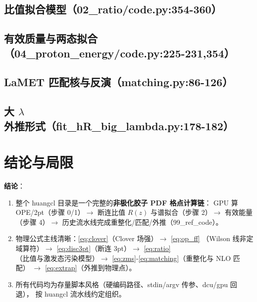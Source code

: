 \documentclass[UTF8,11pt]{ctexart}
\begin{document}
\subsection{比值拟合模型（02\_ratio/code.py:354-360）}


\subsection{有效质量与两态拟合（04\_proton\_energy/code.py:225-231,354）}


\subsection{LaMET 匹配核与反演（matching.py:86-126）}


\subsection{大 $\lambda$ 外推形式（fit\_hR\_big\_lambda.py:178-182）}


\section{结论与局限}
\label{sec:conclusion}

\textbf{结论}：
\begin{enumerate}
  \item 整个 huangcl 目录是一个完整的\textbf{非极化胶子 PDF 格点计算链}：
  GPU 算 OPE/2pt（步骤 0/1）$\to$ 断连比值 $R(z)$ 与谱拟合（步骤 2）$\to$
  有效能量（步骤 4）$\to$ 历史流水线完成重整化/匹配/外推（99\_ref\_code）。
  \item 物理公式主线清晰：\eqref{eq:clover}（Clover 场强）$\to$ \eqref{eq:op_ff}
  （Wilson 线非定域算符）$\to$ \eqref{eq:disc3pt}（断连 3pt）$\to$ \eqref{eq:ratio}
  （比值与激发态污染模型）$\to$ \eqref{eq:zms}-\eqref{eq:matching}（重整化与 NLO 匹配）
  $\to$ \eqref{eq:extrap}（外推到物理点）。
  \item 所有代码均为存量脚本风格（硬编码路径、stdin/argv 传参、dcu/gpu 回退），
  按 huangcl 流水线约定组织。
\end{enumerate}
\end{document}
